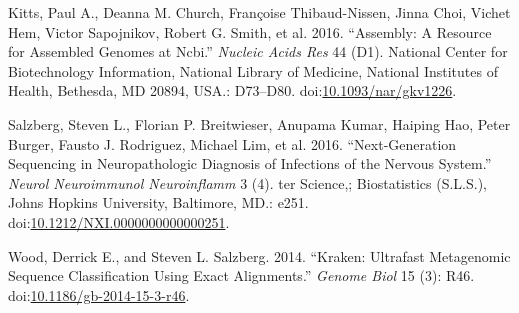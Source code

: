 \documentclass[]{article}
\begin{document}
\hypertarget{ref-PKitts_AKimchi2016-NAR}{}
Kitts, Paul A., Deanna M. Church, Françoise Thibaud-Nissen, Jinna Choi,
Vichet Hem, Victor Sapojnikov, Robert G. Smith, et al. 2016. ``Assembly:
A Resource for Assembled Genomes at Ncbi.'' \emph{Nucleic Acids Res} 44
(D1). National Center for Biotechnology Information, National Library of
Medicine, National Institutes of Health, Bethesda, MD 20894, USA.:
D73--D80.
doi:\href{https://doi.org/10.1093/nar/gkv1226}{10.1093/nar/gkv1226}.

\hypertarget{ref-SSalzberg_CPardo2016-NNN}{}
Salzberg, Steven L., Florian P. Breitwieser, Anupama Kumar, Haiping Hao,
Peter Burger, Fausto J. Rodriguez, Michael Lim, et al. 2016.
``Next-Generation Sequencing in Neuropathologic Diagnosis of Infections
of the Nervous System.'' \emph{Neurol Neuroimmunol Neuroinflamm} 3 (4).
ter Science,; Biostatistics (S.L.S.), Johns Hopkins University,
Baltimore, MD.: e251.
doi:\href{https://doi.org/10.1212/NXI.0000000000000251}{10.1212/NXI.0000000000000251}.

\hypertarget{ref-DWood_SSalzberg2014-GB}{}
Wood, Derrick E., and Steven L. Salzberg. 2014. ``Kraken: Ultrafast
Metagenomic Sequence Classification Using Exact Alignments.''
\emph{Genome Biol} 15 (3): R46.
doi:\href{https://doi.org/10.1186/gb-2014-15-3-r46}{10.1186/gb-2014-15-3-r46}.
\end{document}
